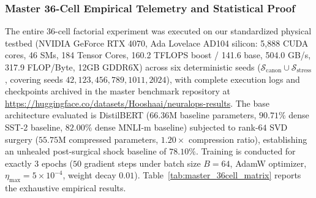 \subsubsection{Master 36-Cell Empirical Telemetry and Statistical Proof}
\label{sec:ablations_master_table}

The entire 36-cell factorial experiment was executed on our standardized physical testbed (NVIDIA GeForce RTX 4070, Ada Lovelace AD104 silicon: 5,888 CUDA cores, 46 SMs, 184 Tensor Cores, 160.2 TFLOPS boost / 141.6 base, 504.0 GB/s, 317.9 FLOP/Byte, 12GB GDDR6X) across six deterministic seeds ($\mathcal{S}_{\text{canon}} \cup \mathcal{S}_{\text{stress}}$, covering seeds $42, 123, 456, 789, 1011, 2024$), with complete execution logs and checkpoints archived in the master benchmark repository at \url{https://huggingface.co/datasets/Hooshaai/neuralops-results}. The base architecture evaluated is DistilBERT ($66.36\text{M}$ baseline parameters, $90.71\%$ dense SST-2 baseline, $82.00\%$ dense MNLI-m baseline) subjected to rank-$64$ SVD surgery ($55.75\text{M}$ compressed parameters, $1.20\times$ compression ratio), establishing an unhealed post-surgical shock baseline of $78.10\%$. Training is conducted for exactly $3$ epochs ($50$ gradient steps under batch size $B=64$, AdamW optimizer, $\eta_{\max} = 5 \times 10^{-4}$, weight decay $0.01$). Table~\ref{tab:master_36cell_matrix} reports the exhaustive empirical results.

